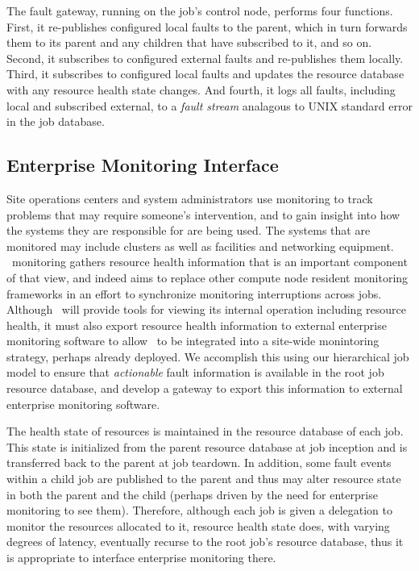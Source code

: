 The fault gateway, running on the job's control node, performs four functions.
First, it re-publishes configured local faults to the parent, which in turn
forwards them to its parent and any children that have subscribed to it,
and so on.
Second, it subscribes to configured external faults and re-publishes them
locally.
Third, it subscribes to configured local faults and updates the resource
database with any resource health state changes.
And fourth, it logs all faults, including local and subscribed external, to
a {\em fault stream} analagous to UNIX standard error in the job database.

\subsection{Enterprise Monitoring Interface}

Site operations centers and system administrators use
monitoring to track problems that may require someone's intervention, and
to gain insight into how the systems they are responsible for are being used.
The systems that are monitored may include clusters as well as facilities
and networking equipment.
\ngrm\ monitoring gathers resource health information that is an important
component of that view, and indeed aims to replace other compute node
resident monitoring frameworks in an effort to synchronize monitoring
interruptions across jobs.
Although \ngrm\ will provide tools for viewing its internal operation
including resource health, it must also export resource health information
to external enterprise monitoring software to allow \ngrm\ to be integrated
into a site-wide monintoring strategy, perhaps already deployed.
We accomplish this using our hierarchical job model to ensure that
{\em actionable} fault information is available in the root job resource
database, and develop a gateway to export this information
to external enterprise monitoring software.

The health state of resources is maintained in the resource database of
each job.
This state is initialized from the parent resource database at job inception
and is transferred back to the parent at job teardown.
In addition, some fault events within a child job are published
to the parent and thus may alter resource state in both the parent and
the child (perhaps driven by the need for enterprise monitoring to see them).
Therefore, although each job is given a delegation to monitor the resources
allocated to it, resource health state does, with varying degrees of latency,
eventually recurse to the root job's resource database, thus it is
appropriate to interface enterprise monitoring there.

